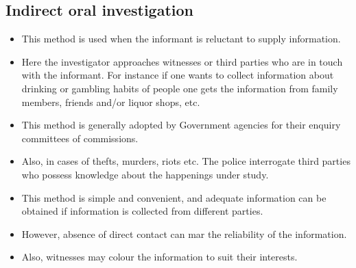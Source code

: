 \documentclass[
10pt, %
a4paper, %
]{report}
\begin{document}
\subsection*{Indirect oral investigation}
\begin{itemize}
\item This method is used when the informant is reluctant to supply
information.
\item Here the investigator approaches witnesses or third parties who are in touch with the informant. For instance if one wants to collect information about drinking or gambling habits of people
one gets the information from family members, friends and/or liquor shops, etc.
\item This method is generally adopted by Government agencies for
their enquiry committees of commissions.
\item Also, in cases of thefts, murders, riots etc. The police interrogate third parties who possess knowledge about the happenings under study.
\item This method is simple and convenient, and adequate information can be obtained if information is collected from different parties.
\item However, absence of direct contact can mar the reliability of the information.
\item Also, witnesses may colour the information to suit their interests.
\end{itemize}
\end{document}
